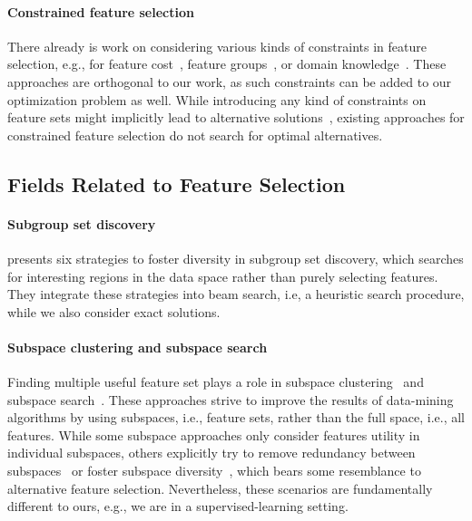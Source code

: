 \documentclass{article}
\theoremstyle{definition}
\begin{document}
\paragraph{Constrained feature selection}

There already is work on considering various kinds of constraints in feature selection, e.g., for feature cost~\cite{paclik2002feature}, feature groups~\cite{yuan2006model}, or domain knowledge~\cite{bach2022empirical, groves2015toward}.
These approaches are orthogonal to our work, as such constraints can be added to our optimization problem as well.
While introducing any kind of constraints on feature sets might implicitly lead to alternative solutions~\cite{bach2022empirical}, existing approaches for constrained feature selection do not search for optimal alternatives.

\subsection{Fields Related to Feature Selection}

\paragraph{Subgroup set discovery}

\cite{leeuwen2012diverse} presents six strategies to foster diversity in subgroup set discovery, which searches for interesting regions in the data space rather than purely selecting features.
They integrate these strategies into beam search, i.e, a heuristic search procedure, while we also consider exact solutions.

\paragraph{Subspace clustering and subspace search}

Finding multiple useful feature set plays a role in subspace clustering~\cite{guan2011unified, hu2018subspace, mueller2009relevant} and subspace search~\cite{fouche2021efficient, nguyen20134s, trittenbach2019dimension}.
These approaches strive to improve the results of data-mining algorithms by using subspaces, i.e., feature sets, rather than the full space, i.e., all features.
While some subspace approaches only consider features utility in individual subspaces, others explicitly try to remove redundancy between subspaces~\cite{mueller2009relevant, nguyen20134s} or foster subspace diversity~\cite{fouche2021efficient, trittenbach2019dimension}, which bears some resemblance to alternative feature selection.
Nevertheless, these scenarios are fundamentally different to ours, e.g., we are in a supervised-learning setting.
\end{document}

